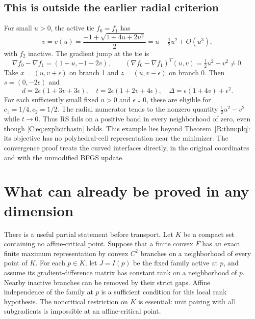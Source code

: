 

\subsection{This is outside the earlier radial criterion}
For small $u>0$, the active tie $f_0=f_1$ has
\[
 v=v(u)=\frac{-1+\sqrt{1+4u+2u^2}}2
 =u-\tfrac12u^2+O(u^3),
\]
with $f_2$ inactive. The gradient jump at the tie is
\[
 \nabla f_0-\nabla f_1=(1+u,-1-2v),\qquad
 (\nabla f_0-\nabla f_1)^T(u,v)=\tfrac12u^2-v^2\ne0.
\]
Take $x=(u,v+\epsilon)$ on branch 1 and $z=(u,v-\epsilon)$ on branch 0. Then $s=(0,-2\epsilon)$ and
\[
 d=2\epsilon(1+3v+3\epsilon),\quad
 t=2\epsilon(1+2v+4\epsilon),\quad
 \Delta=\epsilon(1+4v)+\epsilon^2.
\]
For each sufficiently small fixed $u>0$ and $\epsilon\downarrow0$, these are eligible for $c_1=1/4,c_2=1/2$. The radial numerator tends to the nonzero quantity $\tfrac12u^2-v^2$ while $t\to0$. Thus RS fails on a positive band in every neighborhood of zero, even though \eqref{C:eq:explicitbasin} holds. This example lies beyond Theorem~\ref{R:thm:plq}: its objective has no polyhedral-cell representation near the minimizer. The convergence proof treats the curved interfaces directly, in the original coordinates and with the unmodified BFGS update.


\setcounter{section}{8}
\setcounter{theorem}{7}
\setcounter{equation}{17}


\section{What can already be proved in any dimension}

There is a useful partial statement before transport. Let $K$ be a compact set containing no affine-critical point. Suppose that a finite convex $F$ has an exact finite maximum representation by convex $C^2$ branches on a neighborhood of every point of $K$. For each $p\in K$, let $J=I(p)$ be the fixed family active at $p$, and assume its gradient-difference matrix has constant rank on a neighborhood of $p$. Nearby inactive branches can be removed by their strict gaps. Affine independence of the family at $p$ is a sufficient condition for this local rank hypothesis. The noncritical restriction on $K$ is essential: unit pairing with all subgradients is impossible at an affine-critical point.


